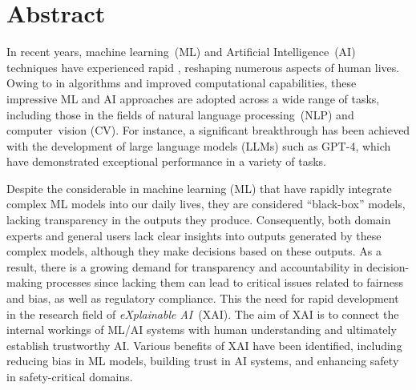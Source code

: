 

\section*{Abstract}

In recent years, machine learning~(ML) and Artificial Intelligence~(AI) techniques have
experienced rapid , reshaping numerous aspects of human lives.
%
Owing to  in algorithms and improved computational capabilities, 
these impressive ML and AI approaches are adopted across a wide range of tasks, 
including those in the fields of natural language processing~(NLP) and computer~vision (CV).
%
For instance, a significant breakthrough has been achieved with the development of 
large language models (LLMs) such as GPT-4, which have demonstrated exceptional 
performance in a variety of  tasks.

Despite the considerable  in machine learning (ML) that 
have rapidly integrate complex ML models into our daily lives, 
they are considered ``black-box'' models, lacking transparency in the outputs they produce. 
%
Consequently, both domain experts and general users lack 
clear insights into outputs generated by these complex models, 
although they make decisions based on these outputs.
%
As a result, there is a growing demand for transparency and accountability in 
decision-making processes since lacking them can lead to critical issues related to fairness and bias, 
as well as regulatory compliance. 
%
This  the need for rapid development in the research field of \emph{eXplainable AI}~(XAI).
%
The aim of XAI is to connect the internal workings of ML/AI systems with human understanding
and ultimately establish trustworthy AI.
%
Various benefits of XAI have been identified, including reducing bias in ML models,
building trust in AI systems, and enhancing safety in safety-critical domains.


